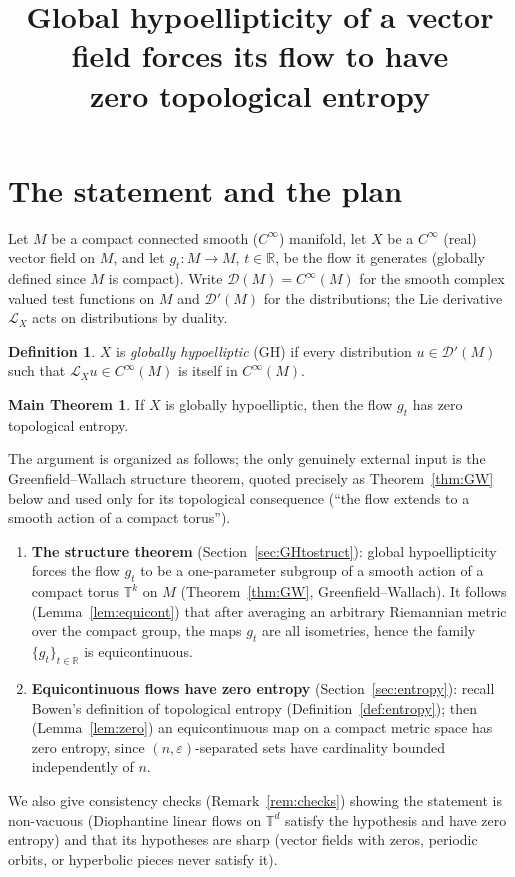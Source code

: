 \documentclass[11pt]{article}
\title{Global hypoellipticity of a vector field forces its flow to have\\
zero topological entropy}
\author{}
\date{}
\theoremstyle{definition}
\newtheorem{definition}[theorem]{Definition}
\newtheorem*{mainthm}{Main Theorem}
\newcommand{\calL}{\mathcal{L}}
\newcommand{\TT}{\mathbb{T}}
\newcommand{\RR}{\mathbb{R}}
\begin{document}
\maketitle

\section{The statement and the plan}\label{sec:intro}

Let $M$ be a compact connected smooth ($C^\infty$) manifold, let $X$ be a
$C^\infty$ (real) vector field on $M$, and let $g_t : M \to M$,
$t \in \RR$, be the flow it generates (globally defined since $M$ is
compact). Write $\mathcal{D}(M) = C^\infty(M)$ for the smooth complex
valued test functions on $M$ and $\mathcal{D}'(M)$ for the distributions;
the Lie derivative $\calL_X$ acts on distributions by duality.

\begin{definition}\label{def:GH}
$X$ is \emph{globally hypoelliptic} (GH) if every distribution
$u \in \mathcal{D}'(M)$ such that $\calL_X u \in C^\infty(M)$ is itself in
$C^\infty(M)$.
\end{definition}

\begin{mainthm}
If $X$ is globally hypoelliptic, then the flow $g_t$ has zero topological
entropy.
\end{mainthm}

The argument is organized as follows; the only genuinely external input is
the Greenfield--Wallach structure theorem, quoted precisely as
Theorem~\ref{thm:GW} below and used only for its topological consequence
(``the flow extends to a smooth action of a compact torus'').
\begin{enumerate}[label=(\arabic*), leftmargin=2.5em]
  \item \textbf{The structure theorem} (Section~\ref{sec:GHtostruct}):
        global hypoellipticity forces the flow $g_t$ to be a
        one-parameter subgroup of a smooth action of a compact torus
        $\TT^k$ on $M$ (Theorem~\ref{thm:GW}, Greenfield--Wallach).
        It follows (Lemma~\ref{lem:equicont}) that after averaging an
        arbitrary Riemannian metric over the compact group, the maps
        $g_t$ are all isometries, hence the family
        $\{g_t\}_{t \in \RR}$ is equicontinuous.
  \item \textbf{Equicontinuous flows have zero entropy}
        (Section~\ref{sec:entropy}): recall Bowen's definition of
        topological entropy (Definition~\ref{def:entropy}); then
        (Lemma~\ref{lem:zero}) an equicontinuous map on a compact metric
        space has zero entropy, since $(n,\varepsilon)$-separated sets
        have cardinality bounded independently of $n$.
\end{enumerate}
We also give consistency checks (Remark~\ref{rem:checks}) showing the
statement is non-vacuous (Diophantine linear flows on $\TT^d$ satisfy the
hypothesis and have zero entropy) and that its hypotheses are sharp
(vector fields with zeros, periodic orbits, or hyperbolic pieces never
satisfy it).
\end{document}
